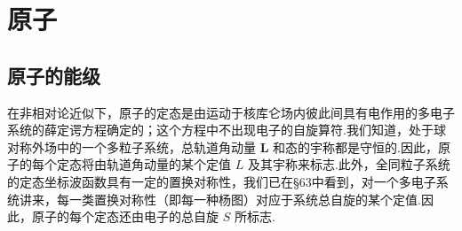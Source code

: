 %
\chapter{原子}

\section{原子的能级}

在非相对论近似下，原子的定态是由运动于核库仑场内彼此间具有电作用的多电子系统的薛定谔方程确定的；这个方程中不出现电子的自旋算符.我们知道，处于球对称外场中的一个多粒子系统，总轨道角动量 $\boldsymbol{L}$ 和态的宇称都是守恒的.因此，原子的每个定态将由轨道角动量的某个定值 $L$ 及其宇称来标志.此外，全同粒子系统的定态坐标波函数具有一定的置换对称性，我们已在§63中看到，对一个多电子系统讲来，每一类置换对称性（即每一种杨图）对应于系统总自旋的某个定值.因此，原子的每个定态还由电子的总自旋 $S$ 所标志.

